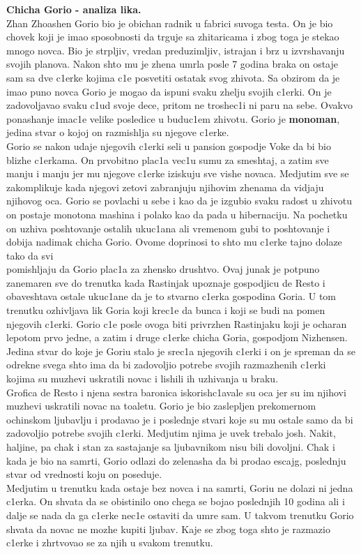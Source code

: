 \documentclass[11pt]{article}
\begin{document}
\begin{p}
\textbf{Chicha Gorio - analiza lika.}\\
Zhan Zhoashen Gorio bio je obichan radnik u fabrici suvoga testa. On je bio chovek koji je imao sposobnosti da trguje sa zhitaricama i zbog toga je stekao mnogo novca. Bio je strpljiv, vredan preduzimljiv, istrajan i brz u izvrshavanju svojih planova. Nakon shto mu je zhena umrla posle 7 godina braka on ostaje sam sa dve c1erke kojima c1e posvetiti ostatak svog zhivota. Sa obzirom da je imao puno novca Gorio je mogao da ispuni svaku zhelju svojih c1erki. On je zadovoljavao svaku c1ud svoje dece, pritom ne troshec1i ni paru na sebe. Ovakvo ponashanje imac1e velike posledice u buduc1em zhivotu. Gorio je \textbf{monoman}, jedina stvar o kojoj on razmishlja su njegove c1erke.\\

Gorio se nakon udaje njegovih c1erki seli u pansion gospodje Voke da bi bio blizhe c1erkama. On prvobitno plac1a vec1u sumu za smeshtaj, a zatim sve manju i manju jer mu njegove c1erke iziskuju sve vishe novaca. Medjutim sve se zakomplikuje kada njegovi zetovi zabranjuju njihovim zhenama da vidjaju njihovog oca. Gorio se povlachi u sebe i kao da je izgubio svaku radost u zhivotu on postaje monotona mashina i polako kao da pada u hibernaciju. Na pochetku on uzhiva poshtovanje ostalih ukuc1ana ali vremenom gubi to poshtovanje i dobija nadimak chicha Gorio. Ovome doprinosi to shto mu c1erke tajno dolaze tako da svi \\pomishljaju da Gorio plac1a za zhensko drushtvo. Ovaj junak je potpuno zanemaren sve do trenutka kada Rastinjak upoznaje gospodjicu de Resto i obaveshtava ostale ukuc1ane da je to stvarno c1erka gospodina Goria. U tom trenutku ozhivljava lik Goria koji krec1e da bunca i koji se budi na pomen njegovih c1erki. Gorio c1e posle ovoga biti privrzhen Rastinjaku koji je ocharan lepotom prvo jedne, a zatim i druge c1erke chicha Goria, gospodjom Nizhensen. Jedina stvar do koje je Goriu stalo je srec1a njegovih c1erki i on je spreman da se odrekne svega shto ima da bi zadovoljio potrebe svojih razmazhenih c1erki kojima su muzhevi uskratili novac i lishili ih uzhivanja u braku.\\

Grofica de Resto i njena sestra baronica iskorish$ $c1avale su oca jer su im njihovi muzhevi uskratili novac na toaletu. Gorio je bio zaslepljen prekomernom ochinskom ljubavlju i prodavao je i poslednje stvari koje su mu ostale samo da bi zadovoljio potrebe svojih c1erki. Medjutim njima je uvek trebalo josh. Nakit, haljine, pa chak i stan za sastajanje sa ljubavnikom nisu bili dovoljni. Chak i kada je bio na samrti, Gorio odlazi do zelenasha da bi prodao escajg, poslednju stvar od vrednosti koju on poseduje.\\

Medjutim u trenutku kada ostaje bez novca i na samrti, Goriu ne dolazi ni jedna c1erka. On s{}hvata da se obistinilo ono chega se bojao poslednjih 10 godina ali i dalje se nada da ga c1erke nec1e ostaviti da umre sam. U takvom trenutku Gorio s{}hvata da novac ne mozhe kupiti ljubav. Kaje se zbog toga shto je razmazio c1erke i zhrtvovao se za njih u svakom trenutku. 
\end{p}
\end{document}
